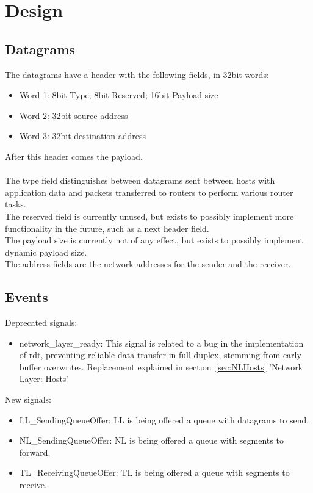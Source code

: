 \section{Design}
\subsection{Datagrams}
\label{sec:DATAGRAM}
The datagrams have a header with the following fields, in 32bit words:
\begin{itemize}
\item Word 1: 8bit Type; 8bit Reserved; 16bit Payload size
\item Word 2: 32bit source address
\item Word 3: 32bit destination address
\end{itemize}

After this header comes the payload.\\
\\
The type field distinguishes between datagrams sent between hosts with application data and packets transferred to routers to perform various router tasks.\\
The reserved field is currently unused, but exists to possibly implement more functionality in the future, such as a next header field.\\
The payload size is currently not of any effect, but exists to possibly implement dynamic payload size.\\
The address fields are the network addresses for the sender and the receiver.

\subsection{Events}
Deprecated signals:
\begin{itemize}
\item network\_layer\_ready: This signal is related to a bug in the implementation of rdt, preventing reliable data transfer in full duplex, stemming from early buffer overwrites. Replacement explained in section~\ref{sec:NLHosts} 'Network Layer: Hosts'
\end{itemize}

New signals:
\begin{itemize}
\item LL\_SendingQueueOffer: LL is being offered a queue with datagrams to send.
\item NL\_SendingQueueOffer: NL is being offered a queue with segments to forward.
\item TL\_ReceivingQueueOffer: TL is being offered a queue with segments to receive.
\end{itemize}

